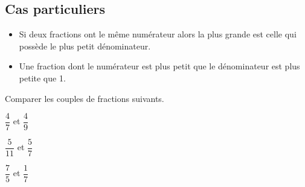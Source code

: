 \documentclass[a4paper]{book}
\begin{document}
\subsection{Cas particuliers}

    \begin{propriete}
        \begin{itemize}
            \item Si deux fractions ont le même numérateur alors la plus grande est celle qui possède le plus petit dénominateur.
            \item Une fraction dont le numérateur est plus petit que le dénominateur est plus petite que 1.
        \end{itemize}
    \end{propriete}


    \begin{exemple}
        Comparer les couples de fractions suivants.

        \begin{minipage}{0.3\linewidth}
            $\dfrac{4}{7}$ et $\dfrac{4}{9}$

            \vspace{2cm}
        \end{minipage}
        \hfill\vline\hfill
        \begin{minipage}{0.3\linewidth}
            $\dfrac{5}{11}$ et $\dfrac{5}{7}$

            \vspace{2cm}
        \end{minipage}
        \hfill\vline\hfill
        \begin{minipage}{0.3\linewidth}
            $\dfrac{7}{5}$ et $\dfrac{1}{7}$

            \vspace{1.5cm}
        \end{minipage}
    \end{exemple}
\end{document}
